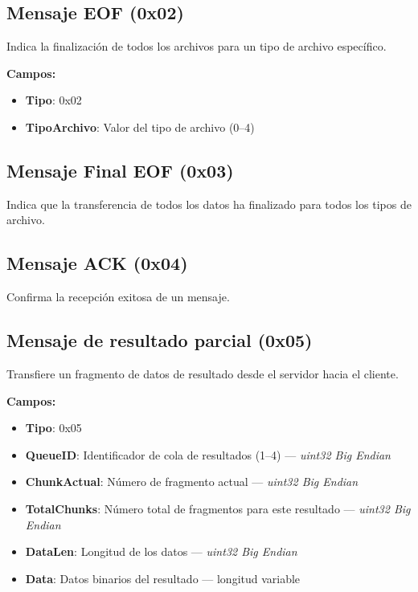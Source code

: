 \documentclass[titlepage,a4paper]{article}
\begin{document}
\subsection{Mensaje EOF (0x02)}

Indica la finalización de todos los archivos para un tipo de archivo específico.

\textbf{Campos:}
\begin{itemize}
	\item \textbf{Tipo}: 0x02
	\item \textbf{TipoArchivo}: Valor del tipo de archivo (0–4)
\end{itemize}

\subsection{Mensaje Final EOF (0x03)}

Indica que la transferencia de todos los datos ha finalizado para todos los tipos de archivo.

\subsection{Mensaje ACK (0x04)}

Confirma la recepción exitosa de un mensaje.

\subsection{Mensaje de resultado parcial (0x05)}

Transfiere un fragmento de datos de resultado desde el servidor hacia el cliente.

\textbf{Campos:}
\begin{itemize}
	\item \textbf{Tipo}: 0x05
	\item \textbf{QueueID}: Identificador de cola de resultados (1–4) — \textit{uint32 Big Endian}
	\item \textbf{ChunkActual}: Número de fragmento actual — \textit{uint32 Big Endian}
	\item \textbf{TotalChunks}: Número total de fragmentos para este resultado — \textit{uint32 Big Endian}
	\item \textbf{DataLen}: Longitud de los datos — \textit{uint32 Big Endian}
	\item \textbf{Data}: Datos binarios del resultado — longitud variable
\end{itemize}
\end{document}
